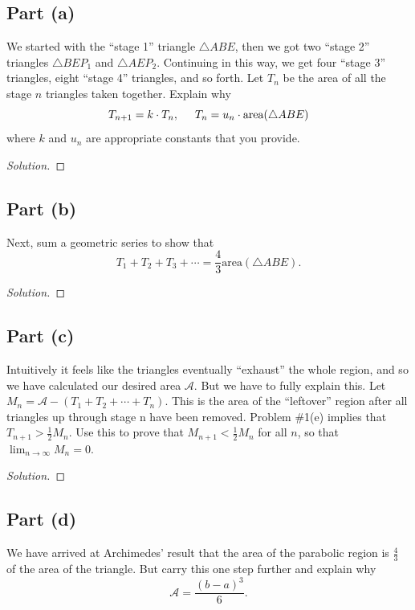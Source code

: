 \documentclass[letterpaper, 12pt]{amsart}
\theoremstyle{definition}  %
\begin{document}
		\subsection*{Part (a)}
		We started with the ``stage 1'' triangle $\triangle ABE$, then we got two ``stage 2'' triangles $\triangle BEP_{1}$ and $\triangle AEP_{2}$. 
		Continuing in this way, we get four ``stage 3'' triangles, eight ``stage 4'' triangles, and so forth. 
		Let $T_{n}$ be the area of all the stage $n$ triangles taken together. 
		Explain why $$T_{n+1} = k \cdot T_{n}, \hspace{5mm} T_{n} = u_{n} \cdot \text{area}(\triangle ABE)$$ where $k$ and $u_{n}$ are appropriate constants that you provide.

		\begin{proof}[Solution]
		\end{proof}

		\subsection*{Part (b)}
		Next, sum a geometric series to show that $$T_{1} + T_{2} + T_{3} + \cdots = \frac{4}{3}\text{area}(\triangle ABE).$$

		\begin{proof}[Solution]
		\end{proof}

		\subsection*{Part (c)}
		Intuitively it feels like the triangles eventually ``exhaust'' the whole region, and so we have calculated our desired area $\mathcal{A}$. 
		But we have to fully explain this. 
		Let $M_{n} = \mathcal{A} - (T_{1} + T_{2} + \cdots + T_{n})$. 
		This is the area of the ``leftover'' region after all triangles up through stage n have been removed. 
		Problem \#1(e) implies that $T_{n+1} > \frac{1}{2}M_{n}$. 
		Use this to prove that $M_{n+1} < \frac{1}{2}M_{n}$ for all $n$, so that $\lim_{n \to \infty} M_{n} = 0$.

		\begin{proof}[Solution]
		\end{proof}

		\subsection*{Part (d)}
		We have arrived at Archimedes' result that the area of the parabolic region is $\frac{4}{3}$ of the area of the triangle. 
		But carry this one step further and explain why $$\mathcal{A} = \frac{(b-a)^{3}}{6}.$$
\end{document}
